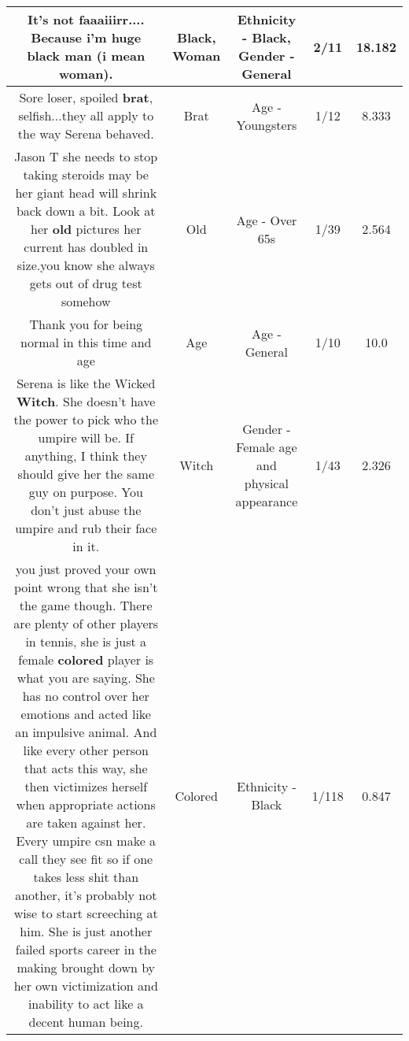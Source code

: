 \documentclass[11pt]{article}
\newlength\mylength
\begin{document}
\begin{center}
\begin{longtable}{|C{.65\mylength}|C{.30\mylength}|C{.12\mylength}|C{.12\mylength}|C{.12\mylength}|}
  \small It's not faaaiiirr.... Because i'm huge \textbf{black} man (i mean \textbf{woman}).\normalsize   & Black, Woman & Ethnicity - Black, Gender - General & 2/11 & 18.182 \\  \hline
  \small Sore loser, spoiled \textbf{brat}, selfish...they all apply to the way Serena behaved.\normalsize   & Brat & Age - Youngsters & 1/12 & 8.333 \\  \hline
  \small Jason T she needs to stop taking steroids may be her giant head will shrink back down a bit. Look at her \textbf{old} pictures  her current has doubled in size.you know she always gets out of drug test somehow\normalsize   & Old & Age - Over 65s & 1/39 & 2.564 \\  \hline
  \small Thank you for being normal in this time and age\normalsize   & Age & Age - General & 1/10 & 10.0 \\  \hline
  \small Serena is like the Wicked \textbf{Witch}.  She doesn't have the power to pick who the umpire will be.  If anything, I think they should give her the same guy on purpose.  You don't just abuse the umpire and rub their face in it.\normalsize   & Witch & Gender - Female age and physical appearance & 1/43 & 2.326 \\  \hline
  \small {} you just proved your own point wrong that she isn't the game though. There are plenty of other players in tennis, she is just a female \textbf{colored} player is what you are saying. She has no control over her emotions and acted like an impulsive animal. And like every other person that acts this way, she then victimizes herself when appropriate actions are taken against her. Every umpire csn make a call they see fit so if one takes less shit than another, it's probably not wise to start screeching at him. She is just another failed sports career in the making brought down by her own victimization and inability to act like a decent human being.\normalsize   & Colored & Ethnicity - Black & 1/118 & 0.847 \\  \hline

\end{longtable}
\end{center}
\end{document}
